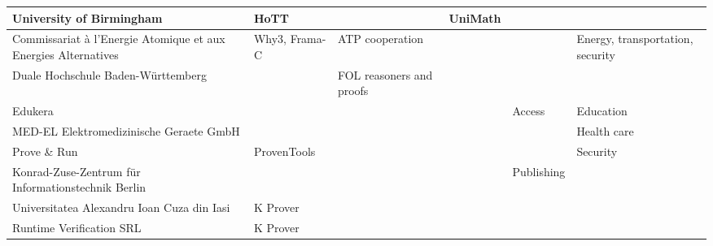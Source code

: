\begin{longtable*}{|p{0.3\textwidth}|p{0.15\textwidth}|p{0.1\textwidth}|p{0.1\textwidth}|p{0.1\textwidth}|p{0.1\textwidth}|}
\hline
University of Birmingham
&
HoTT
&
&
UniMath
&
&
\\
\hline
Commissariat à l’Energie Atomique et aux Energies Alternatives
&
Why3, Frama-C
&
ATP cooperation
&
&
&
Energy, transportation, security
\\
\hline
Duale Hochschule Baden-Württemberg
&
&
FOL reasoners and proofs
&
&
&
\\
\hline
Edukera
&
&
&
&
Access
&
Education
\\
\hline
MED-EL Elektromedizinische Geraete GmbH
&
&
&
&
&
Health care
\\
\hline
Prove \& Run
&
ProvenTools
&
&
&
&
Security
\\
\hline
Konrad-Zuse-Zentrum für Informationstechnik Berlin
&
&
&
&
Publishing
&
\\
\hline
Universitatea Alexandru Ioan Cuza din Iasi
&
K Prover
&
&
&
&
\\
\hline
Runtime Verification SRL
&
K Prover
&
&
&
&
\\
\hline
\end{longtable*}

